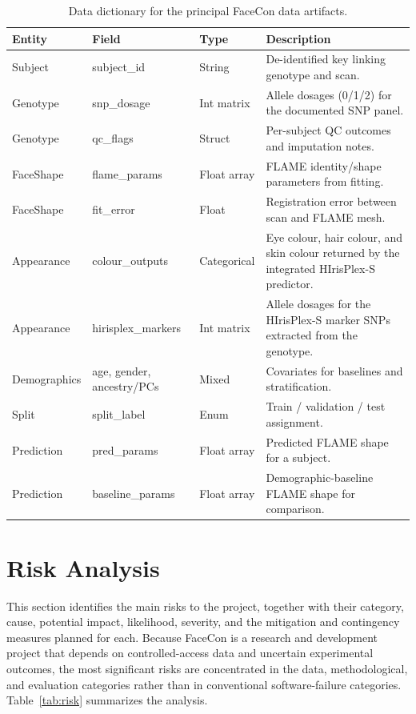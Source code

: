 \begin{table}[!ht]
\centering
\caption{Data dictionary for the principal FaceCon data artifacts.}
\label{tab:datadict}
\small
\begin{tabular}{|P{2.6cm}|P{2.6cm}|P{2.2cm}|P{5.4cm}|}
\hline
\textbf{Entity} & \textbf{Field} & \textbf{Type} & \textbf{Description} \\ \hline
Subject & subject\_id & String & De-identified key linking genotype and scan. \\ \hline
Genotype & snp\_dosage & Int matrix & Allele dosages (0/1/2) for the documented SNP panel. \\ \hline
Genotype & qc\_flags & Struct & Per-subject QC outcomes and imputation notes. \\ \hline
FaceShape & flame\_params & Float array & FLAME identity/shape parameters from fitting. \\ \hline
FaceShape & fit\_error & Float & Registration error between scan and FLAME mesh. \\ \hline
Appearance & colour\_outputs & Categorical & Eye colour, hair colour, and skin colour returned by the integrated HIrisPlex-S predictor. \\ \hline
Appearance & hirisplex\_markers & Int matrix & Allele dosages for the HIrisPlex-S marker SNPs extracted from the genotype. \\ \hline
Demographics & age, gender, ancestry/PCs & Mixed & Covariates for baselines and stratification. \\ \hline
Split & split\_label & Enum & Train / validation / test assignment. \\ \hline
Prediction & pred\_params & Float array & Predicted FLAME shape for a subject. \\ \hline
Prediction & baseline\_params & Float array & Demographic-baseline FLAME shape for comparison. \\ \hline
\end{tabular}
\end{table}

\section{Risk Analysis}
This section identifies the main risks to the project, together with their category, cause, potential impact, likelihood, severity, and the mitigation and contingency measures planned for each. Because FaceCon is a research and development project that depends on controlled-access data and uncertain experimental outcomes, the most significant risks are concentrated in the data, methodological, and evaluation categories rather than in conventional software-failure categories. Table~\ref{tab:risk} summarizes the analysis.

